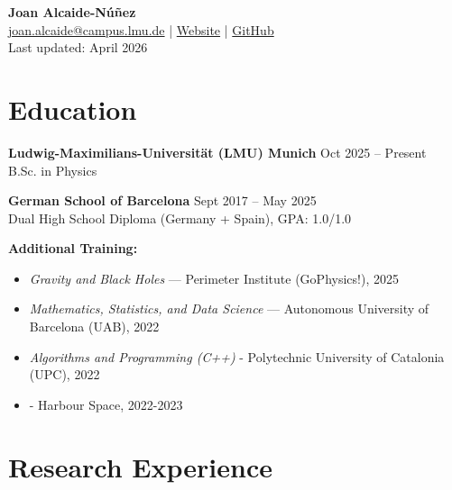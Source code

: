 \documentclass[11pt,a4paper]{article}
\begin{document}
\begin{center}
    {\LARGE \textbf{Joan Alcaide-Núñez}} \\
    \vspace{4pt}
    \href{mailto:joan.alcaide@campus.lmu.de}{joan.alcaide@campus.lmu.de} \quad | \quad 
    \href{https://joanalnu.github.io}{Website} \quad | \quad 
    \href{https://github.com/joanalnu}{GitHub} \\
    Last updated: April 2026
\end{center}

\section*{Education}
\textbf{Ludwig-Maximilians-Universität (LMU) Munich} \hfill Oct 2025 -- Present \\
B.Sc. in Physics

\textbf{German School of Barcelona} \hfill Sept 2017 -- May 2025 \\
Dual High School Diploma (Germany + Spain), GPA: 1.0/1.0

\textbf{Additional Training:}
\begin{itemize}
    \item \textit{Gravity and Black Holes} — Perimeter Institute (GoPhysics!), 2025
		\item \textit{Mathematics, Statistics, and Data Science} — Autonomous University of Barcelona (UAB), 2022
		\item \textit{Algorithms and Programming (C++)} - Polytechnic University of Catalonia (UPC), 2022
		\item {} - Harbour Space, 2022-2023
\end{itemize}

\section*{Research Experience}

\end{document}
